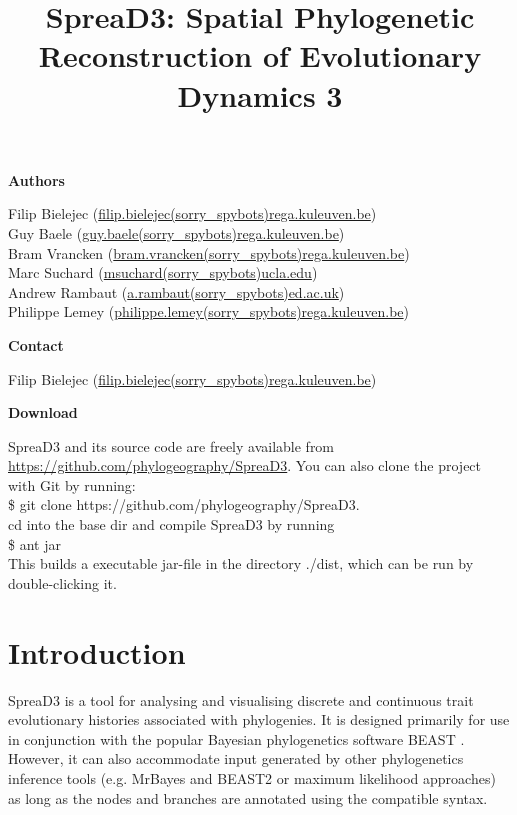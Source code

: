 \documentclass[english]{paper}
\def \spreadname {SpreaD3}
\begin{document}
\title{{\spreadname}: Spatial Phylogenetic Reconstruction of Evolutionary Dynamics 3}
\maketitle

\begin{flushleft}
\textbf{Authors}
\par\end{flushleft}

\noindent
Filip Bielejec (\url{filip.bielejec(sorry_spybots)rega.kuleuven.be}) \\
Guy Baele (\url{guy.baele(sorry_spybots)rega.kuleuven.be}) \\
Bram Vrancken  (\url{bram.vrancken(sorry_spybots)rega.kuleuven.be}) \\
Marc Suchard (\url{msuchard(sorry_spybots)ucla.edu})\\
Andrew Rambaut (\url{a.rambaut(sorry_spybots)ed.ac.uk}) \\
Philippe Lemey (\url{philippe.lemey(sorry_spybots)rega.kuleuven.be}) \\

\begin{flushleft}
\textbf{Contact}
\par\end{flushleft}
Filip Bielejec (\url{filip.bielejec(sorry_spybots)rega.kuleuven.be})

\begin{flushleft}
\textbf{Download}
\par\end{flushleft}
{\spreadname} and its source code are freely available from \url{https://github.com/phylogeography/SpreaD3}.
You can also clone the project with Git by running: 
\\\$ git clone https://github.com/phylogeography/SpreaD3.  
\\
cd into the base dir and compile {\spreadname} by running 
\\\$ ant jar
\\
This builds a executable jar-file in the directory ./dist, which can be run by double-clicking it.

\pagebreak{}
\tableofcontents{}
\pagebreak{}

\section{Introduction}
{\spreadname} is 
a tool for analysing and visualising discrete and continuous trait evolutionary histories associated with phylogenies.
It is designed primarily for use in conjunction with the popular Bayesian phylogenetics software BEAST \citep{drummond:2012zr}.
However, it can also accommodate input generated by other phylogenetics inference tools (e.g. MrBayes and BEAST2 or maximum likelihood approaches) as long as the nodes and branches are annotated using the compatible syntax.
\end{document}
